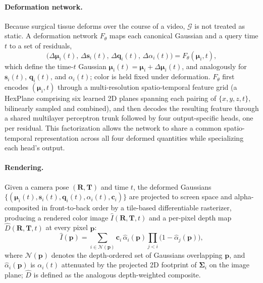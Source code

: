 \paragraph{Deformation network.}
Because surgical tissue deforms over the course of a video, $\mathcal{G}$ is
not treated as static. A deformation network $F_\theta$ maps each canonical
Gaussian and a query time $t$ to a set of residuals,
\begin{equation}
\big(\Delta\boldsymbol{\mu}_i(t),\, \Delta\mathbf{s}_i(t),\, \Delta\mathbf{q}_i(t),\, \Delta\alpha_i(t)\big) = F_\theta(\boldsymbol{\mu}_i, t),
\end{equation}
which define the time-$t$ Gaussian $\boldsymbol{\mu}_i(t) =
\boldsymbol{\mu}_i + \Delta\boldsymbol{\mu}_i(t)$, and analogously for
$\mathbf{s}_i(t)$, $\mathbf{q}_i(t)$, and $\alpha_i(t)$; color is held
fixed under deformation. $F_\theta$ first encodes $(\boldsymbol{\mu}_i, t)$
through a multi-resolution spatio-temporal feature grid (a HexPlane
comprising six learned 2D planes spanning each pairing of $\{x, y, z, t\}$,
bilinearly sampled and combined), and then decodes the resulting feature
through a shared multilayer perceptron trunk followed by four
output-specific heads, one per residual. This factorization allows the
network to share a common spatio-temporal representation across all four
deformed quantities while specializing each head's output.

\paragraph{Rendering.}
Given a camera pose $(\mathbf{R}, \mathbf{T})$ and time $t$, the deformed
Gaussians $\{(\boldsymbol{\mu}_i(t), \mathbf{s}_i(t), \mathbf{q}_i(t),
\alpha_i(t), \mathbf{c}_i)\}$ are projected to screen space and
alpha-composited in front-to-back order by a tile-based differentiable
rasterizer, producing a rendered color image $\hat{I}(\mathbf{R},
\mathbf{T}, t)$ and a per-pixel depth map $\hat{D}(\mathbf{R}, \mathbf{T},
t)$ at every pixel $\mathbf{p}$:
\begin{equation}
\hat{I}(\mathbf{p}) = \sum_{i \in \mathcal{N}(\mathbf{p})} \mathbf{c}_i\, \hat{\alpha}_i(\mathbf{p}) \prod_{j<i}\big(1-\hat{\alpha}_j(\mathbf{p})\big),
\end{equation}
where $\mathcal{N}(\mathbf{p})$ denotes the depth-ordered set of Gaussians
overlapping $\mathbf{p}$, and $\hat{\alpha}_i(\mathbf{p})$ is $\alpha_i(t)$
attenuated by the projected 2D footprint of $\boldsymbol{\Sigma}_i$ on the
image plane; $\hat{D}$ is defined as the analogous depth-weighted
composite.

